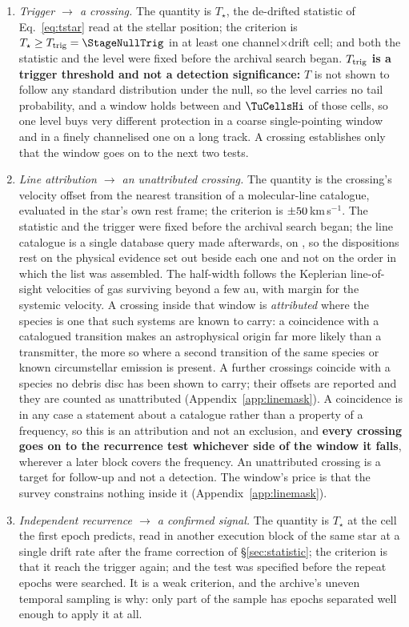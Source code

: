\begin{enumerate}[label=(\roman*),leftmargin=1.9em,itemsep=3pt,topsep=3pt,parsep=0pt]
\item \emph{Trigger $\to$ a crossing.} The quantity is $T_\star$, the
de-drifted statistic of Eq.~\ref{eq:tstar} read at the stellar position; the
criterion is $T_\star\geq T_{\rm trig}=\StageNullTrig$ in at least one
channel$\times$drift cell; and both the statistic and the level were fixed
before the archival search began. \textbf{$T_{\rm trig}$ is a trigger
threshold and not a detection significance:} $T$ is not shown to follow any
standard distribution under the null, so the level carries no tail
probability, and a window holds between \TuCellsLo{} and $\TuCellsHi$ of
those cells, so one level buys very different protection in a coarse
single-pointing window and in a finely channelised one on a long track. A
crossing establishes only that the window goes on to the next two tests.
\item \emph{Line attribution $\to$ an unattributed crossing.} The quantity
is the crossing's velocity offset from the nearest transition of a
molecular-line catalogue, evaluated in the star's own rest frame; the
criterion is $\pm50$\,km\,s$^{-1}$. The statistic and the trigger
were fixed before the archival search began; the line catalogue is a single
database query made afterwards, on \MkListDate, so the dispositions rest on
the physical evidence set out beside each one and not on the order in which
the list was assembled. The half-width follows the Keplerian line-of-sight
velocities of gas
surviving beyond a few au, with margin for the systemic velocity. A crossing
inside that window is \emph{attributed} where the species is one that such
systems are known to carry: a coincidence with a catalogued transition makes
an astrophysical origin far more likely than a transmitter, the more so
where a second transition of the same species or known circumstellar
emission is present. A further \MkNSODecideWord{} crossings coincide with a
species no debris disc has been shown to carry; their offsets are reported
and they are counted as unattributed (Appendix~\ref{app:linemask}).
A coincidence is in any case a statement about a catalogue rather than a
property of a frequency, so this is an attribution and not an exclusion, and
\textbf{every crossing goes on to the recurrence test whichever side of the
window it falls}, wherever a later block covers the frequency. An
unattributed crossing is a target for follow-up and not a detection. The
window's price is that the survey constrains nothing inside it
(Appendix~\ref{app:linemask}).
\item \emph{Independent recurrence $\to$ a confirmed signal.} The quantity is
$T_\star$ at the cell the first epoch predicts, read in another execution
block of the same star at a single drift rate after the frame correction of
\S\ref{sec:statistic}; the criterion is that it reach the trigger again; and
the test was specified before the repeat epochs were searched. It is a weak
criterion, and the archive's uneven temporal sampling is why: only part of
the sample has epochs separated well enough to apply it at all.
\end{enumerate}

